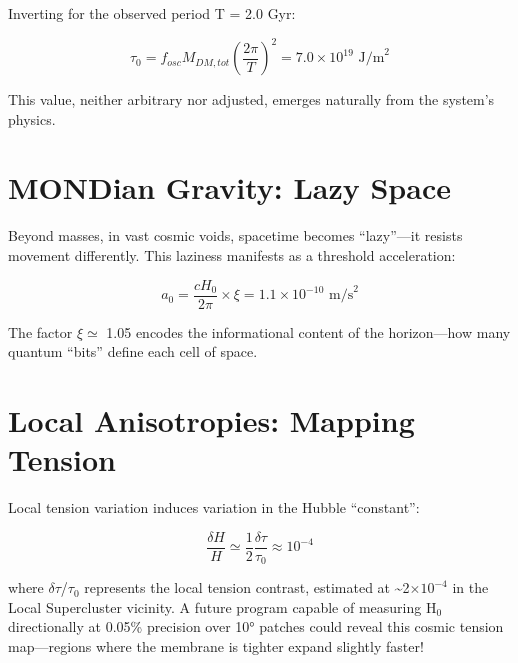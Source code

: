 \documentclass[
  11pt,
]{report}
\begin{document}
Inverting for the observed period T = 2.0 Gyr:

\[\tau_0 = f_{osc} M_{DM,tot} \left(\frac{2\pi}{T}\right)^2 = 7.0 × 10^{19} \text{ J/m}^2\]

This value, neither arbitrary nor adjusted, emerges naturally from the
system's physics.

\section{MONDian Gravity: Lazy
Space}\label{mondian-gravity-lazy-space-1}

Beyond masses, in vast cosmic voids, spacetime becomes ``lazy''---it
resists movement differently. This laziness manifests as a threshold
acceleration:

\[a_0 = \frac{cH_0}{2\pi} × \xi = 1.1 × 10^{-10} \text{ m/s}^2\]

The factor \(\xi \simeq\) 1.05 encodes the informational content of the
horizon---how many quantum ``bits'' define each cell of space.

\section{Local Anisotropies: Mapping
Tension}\label{local-anisotropies-mapping-tension-1}

Local tension variation induces variation in the Hubble ``constant'':

\[\frac{\delta H}{H} \simeq \frac{1}{2} \frac{\delta\tau}{\tau_0} \approx 10^{-4}\]

where \(\delta\tau\)/\(\tau_0\) represents the local tension contrast,
estimated at \textasciitilde2\(\times 10^{-4}\) in the Local
Supercluster vicinity. A future program capable of measuring H\(_0\)
directionally at 0.05\% precision over 10° patches could reveal this
cosmic tension map---regions where the membrane is tighter expand
slightly faster!
\end{document}
